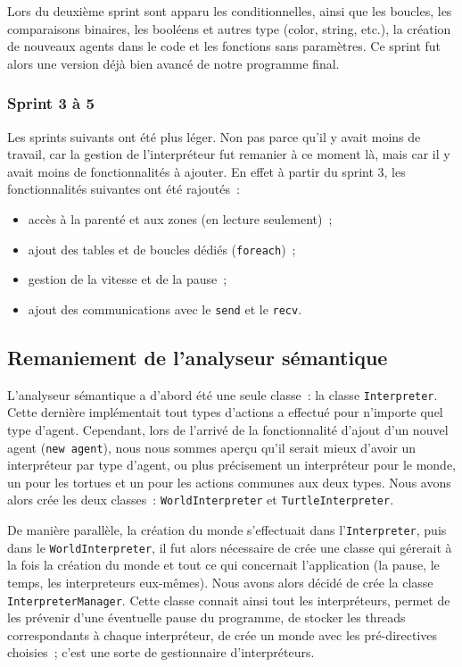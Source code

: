 Lors du deuxième sprint sont apparu les conditionnelles, ainsi que les boucles, les comparaisons binaires, les booléens et autres type (color, string, etc.), la création de nouveaux agents dans le code et les fonctions sans paramètres. Ce sprint fut alors une version déjà bien avancé de notre programme final.


\subsubsection{Sprint 3 à 5}
Les sprints suivants ont été plus léger. Non pas parce qu'il y avait moins de travail, car la gestion de l'interpréteur fut remanier à ce moment là, mais car il y avait moins de fonctionnalités à ajouter. En effet à partir du sprint 3, les fonctionnalités suivantes ont été rajoutés~:
\begin{itemize}
\item accès à la parenté et aux zones (en lecture seulement)~;
\item ajout des tables et de boucles dédiés (\verb|foreach|)~;
\item gestion de la vitesse et de la pause~;
\item ajout des communications avec le \verb|send| et le \verb|recv|.
\end{itemize}


\subsection{Remaniement de l'analyseur sémantique}
\label{remaniementInterpreter}

L'analyseur sémantique a d'abord été une seule classe~: la classe \verb|Interpreter|.
Cette dernière implémentait tout types d'actions a effectué pour n'importe quel type d'agent.
Cependant, lors de l'arrivé de la fonctionnalité d'ajout d'un nouvel agent (\verb|new agent|), nous nous sommes aperçu qu'il serait mieux d'avoir un interpréteur par type d'agent, ou plus précisement un interpréteur pour le monde, un pour les tortues et un pour les actions communes aux deux types.
Nous avons alors crée les deux classes~: \verb|WorldInterpreter| et \verb|TurtleInterpreter|.

De manière parallèle, la création du monde s'effectuait dans l'\verb|Interpreter|, puis dans le \verb|WorldInterpreter|, il fut alors nécessaire de crée une classe qui gérerait à la fois la création du monde et tout ce qui concernait l'application (la pause, le temps, les interpreteurs eux-mêmes). Nous avons alors décidé de crée la classe \verb|InterpreterManager|.
Cette classe connait ainsi tout les interpréteurs, permet de les prévenir d'une éventuelle pause du programme, de stocker les threads correspondants à chaque interpréteur, de crée un monde avec les pré-directives choisies~; c'est une sorte de gestionnaire d'interpréteurs.
